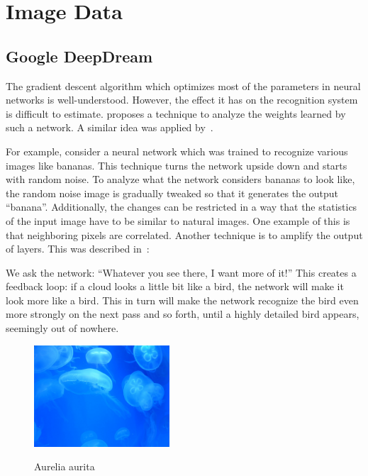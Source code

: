 
\section{Image Data}\label{sec:images}%

\subsection{Google DeepDream}\label{subsec:google-deepdream}%
The gradient descent algorithm which optimizes most of the parameters in neural
networks is well-understood. However, the effect it has on the recognition
system is difficult to estimate. \cite{inceptionism2015} proposes a technique
to analyze the weights learned by such a network. A similar idea was applied
by~\cite{vondrick2013hoggles}.

For example, consider a neural network which was trained to recognize various
images like bananas. This technique turns the network upside down and starts
with random noise. To analyze what the network considers bananas to look like,
the random noise image is gradually tweaked so that it generates the output
\enquote{banana}. Additionally, the changes can be restricted in a way that the
statistics of the input image have to be similar to natural images. One example
of this is that neighboring pixels are correlated.
\goodbreak
Another technique is to amplify the output of layers. This was described
in~\cite{inceptionism2015}:\nobreak%
\begin{displayquote}
We ask the network: \enquote{Whatever you see there, I want more of it!} This
creates a feedback loop: if a cloud looks a little bit like a bird, the network
will make it look more like a bird. This in turn will make the network
recognize the bird even more strongly on the next pass and so forth, until a
highly detailed bird appears, seemingly out of nowhere.
\end{displayquote}

\begin{figure}[ht]
    \centering
    \includegraphics[width=0.45\textwidth]{figures/DeepDream/Aurelia-aurita-3/Aurelia-aurita-3.jpg}
        \label{fig:Aurelia-aurita-3-original}
    \caption{Aurelia aurita}
\end{figure}

